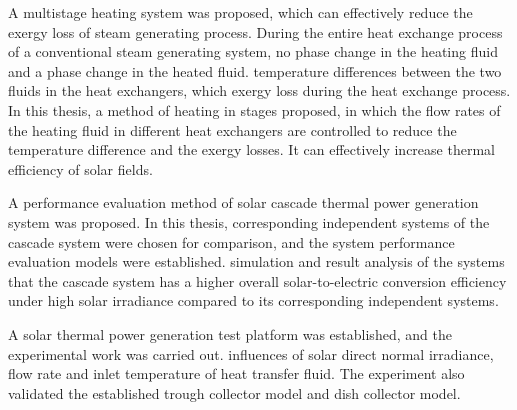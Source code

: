 {A multistage heating system was proposed, which can effectively reduce the exergy loss of steam generating process. During the entire heat exchange process of a conventional steam generating system, no phase change  in the heating fluid and a phase change  in the heated fluid.  temperature differences  between the two fluids in the heat exchangers, which  exergy loss during the heat exchange process. In this thesis, a method of heating in stages  proposed, in which the flow rates of the heating fluid in different heat exchangers are controlled to reduce the temperature difference and the exergy losses. It can effectively increase thermal efficiency of solar fields.

A performance evaluation method of solar cascade thermal power generation system was proposed. In this thesis, corresponding independent systems of the cascade system were chosen for comparison, and the system performance evaluation models were established.  simulation and result analysis of the systems that the cascade system has a higher overall solar-to-electric conversion efficiency under high solar irradiance compared to its corresponding independent systems.

A solar thermal power generation test platform was established, and the experimental work was carried out.  influences of solar direct normal irradiance, flow rate and inlet temperature of heat transfer fluid.
The experiment also validated the established trough collector model and dish collector model.


}
